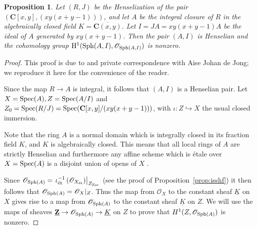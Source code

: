 \documentclass[12pt]{article}
\renewcommand{\O}{\mathscr{O}}
\newcommand{\Z}{\mathbf{Z}}
\newcommand{\C}{\mathbf{C}}
\newcommand{\spec}{{\rm Spec}}
\newcommand{\sph}{{\rm Sph}}
\newcommand{\ol}[1]{\overline{#1}}
\newcommand{\Et}{\'etale\xspace}
\newcommand{\et}{{\rm\acute{e}t}}
\newcommand{\zar}{{\rm Zar}}
\renewcommand{\H}{{\rm H}}
\newcommand{\spcite}[2]{\cite[\href{https://stacks.math.columbia.edu/tag/#1}{{#2} {#1}}]{stackp}}
\newtheorem{proposition}[theorem]{Proposition}
\theoremstyle{definition}
\numberwithin{equation}{subsection}
\begin{document}
\begin{proposition}\label{prop:cxyhglobsec} Let $(R,J)$ be the Henselization of the pair $(\C[x,y],(xy(x+y-1)))$, and let $A$ be the integral closure of $R$ in the algebraically closed field $K=\ol{\C(x,y)}$. Let $I=JA=xy(x+y-1)A$ be the ideal of $A$ generated by $xy(x+y-1)$. Then the pair $(A,I)$ is Henselian and the cohomology group $\H^1(\sph(A,I),\O_{\sph(A,I)})$ is nonzero.
\end{proposition}
\begin{proof} This proof is due to \cite{nothmbblog} and private correspondence with Aise Johan de Jong; we reproduce it here for the convenience of the reader.

Since the map $R \to A$ is integral, it follows that $(A,I)$ is a Henselian pair. Let $X=\spec(A), Z=\spec(A/I)$ and $Z_0=\spec(R/J)=\spec(\C[x,y]/(xy(x+y-1)))$, with $\iota: Z \hookrightarrow X$ the usual closed immersion.

Note that the ring $A$ is a normal domain which is integrally closed in its fraction field $K$, and $K$ is algebraically closed. This means that all local rings of $A$ are strictly Henselian \spcite{0DCS}{Lemma} and furthermore any affine scheme which is \Et over $X=\spec(A)$ is a disjoint union of opens of $X$ \spcite{09Z9}{Lemma}. 

Since $\O_{\sph(A)}=\left.\iota_{\et}^{-1}\left(\O_{X_{\et}}\right)\right|_{Z_{\zar}}$ (see the proof of Proposition~\ref{prop:isshf}) it then follows that $\O_{\sph(A)}=\O_{X}|_Z$. Thus the map from $\O_{X}$ to the constant sheaf $\underline{K}$ on $X$ gives rise to a map from $\O_{\sph(A)}$ to the constant sheaf $\underline{K}$ on $Z$. We will use the maps of sheaves $\underline{\Z} \to \O_{\sph(A)} \to \underline{K}$ on $Z$ to prove that $H^1(Z,\O_{\sph(A)})$ is nonzero.

%




\end{proof}
\end{document}
